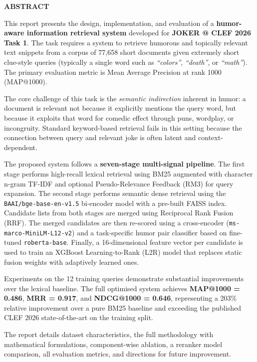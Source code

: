 \thispagestyle{plain}
\begin{center}
    \Large \textbf{\uppercase{Abstract}}
\end{center}

\vspace{2\baselineskip}
\justify

This report presents the design, implementation, and evaluation of a \textbf{humor-aware information retrieval system} developed for \textbf{JOKER @ CLEF 2026 Task 1}. The task requires a system to retrieve humorous and topically relevant text snippets from a corpus of 77,658 short documents given extremely short clue-style queries (typically a single word such as \textit{``colors''}, \textit{``death''}, or \textit{``math''}). The primary evaluation metric is Mean Average Precision at rank 1000 (MAP@1000).

The core challenge of this task is the \textit{semantic indirection} inherent in humor: a document is relevant not because it explicitly mentions the query word, but because it exploits that word for comedic effect through puns, wordplay, or incongruity. Standard keyword-based retrieval fails in this setting because the connection between query and relevant joke is often latent and context-dependent.

The proposed system follows a \textbf{seven-stage multi-signal pipeline}. The first stage performs high-recall lexical retrieval using BM25 augmented with character n-gram TF-IDF and optional Pseudo-Relevance Feedback (RM3) for query expansion. The second stage performs semantic dense retrieval using the \texttt{BAAI/bge-base-en-v1.5} bi-encoder model with a pre-built FAISS index. Candidate lists from both stages are merged using Reciprocal Rank Fusion (RRF). The merged candidates are then re-scored using a cross-encoder (\texttt{ms-marco-MiniLM-L12-v2}) and a task-specific humor pair classifier based on fine-tuned \texttt{roberta-base}. Finally, a 16-dimensional feature vector per candidate is used to train an XGBoost Learning-to-Rank (L2R) model that replaces static fusion weights with adaptively learned ones.

Experiments on the 12 training queries demonstrate substantial improvements over the lexical baseline. The full optimised system achieves \textbf{MAP@1000 = 0.486}, \textbf{MRR = 0.917}, and \textbf{NDCG@1000 = 0.646}, representing a 203\% relative improvement over a pure BM25 baseline and exceeding the published CLEF 2026 state-of-the-art on the training split.

The report details dataset characteristics, the full methodology with mathematical formulations, component-wise ablation, a reranker model comparison, all evaluation metrics, and directions for future improvement.
